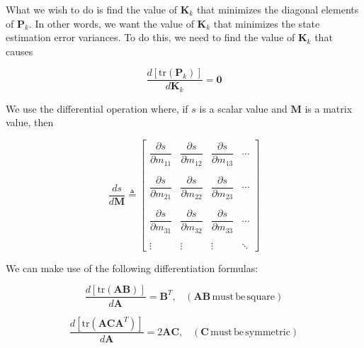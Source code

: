 What we wish to do is find the value of $\mathbf{K}_k$ that minimizes the diagonal
elements of $\mathbf{P}_k$. In other words, we want the value of $\mathbf{K}_k$ that
minimizes the state estimation error variances. To do this, we need to find the value of
$\mathbf{K}_k$ that causes

\begin{equation*}
    \frac {d \left[ \mathrm{tr} \left( \mathbf{P}_k \right) \right] } {d \mathbf{K}_k} = \mathbf{0}
\end{equation*}

We use the differential operation where, if $s$ is a scalar value and $\mathbf{M}$ is a
matrix value, then

\begin{equation*}
    \frac {d s} {d \mathbf{M}} \triangleq 
    \begin{bmatrix}
        \dfrac{\partial s}{\partial m_{11}} & \dfrac{\partial s}{\partial m_{12}} & \dfrac{\partial s}{\partial m_{13}} & \cdots \\
        \phantom{.} \\
        \dfrac{\partial s}{\partial m_{21}} & \dfrac{\partial s}{\partial m_{22}} & \dfrac{\partial s}{\partial m_{23}} & \cdots \\
        \phantom{.} \\
        \dfrac{\partial s}{\partial m_{31}} & \dfrac{\partial s}{\partial m_{32}} & \dfrac{\partial s}{\partial m_{33}} & \cdots \\
        \phantom{.} \\
        \vdots & \vdots & \vdots & \ddots
    \end{bmatrix}
\end{equation*}

We can make use of the following differentiation formulas:

\begin{equation*}
    \frac {d \left[ \mathrm{tr} \left( \mathbf{A} \mathbf{B} \right) \right] } {d \mathbf{A}} = \mathbf{B}^T , \phantom{X} (\mathbf{A} \mathbf{B} \, \mathrm{must} \, \mathrm{be} \, \mathrm{square})
\end{equation*}

\begin{equation*}
    \frac {d \left[ \mathrm{tr} \left( \mathbf{A} \mathbf{C} \mathbf{A}^T \right) \right]} {d \mathbf{A}} = 2 \mathbf{A} \mathbf{C} , \phantom{X} (\mathbf{C} \, \mathrm{must} \, \mathrm{be} \, \mathrm{symmetric})
\end{equation*}

